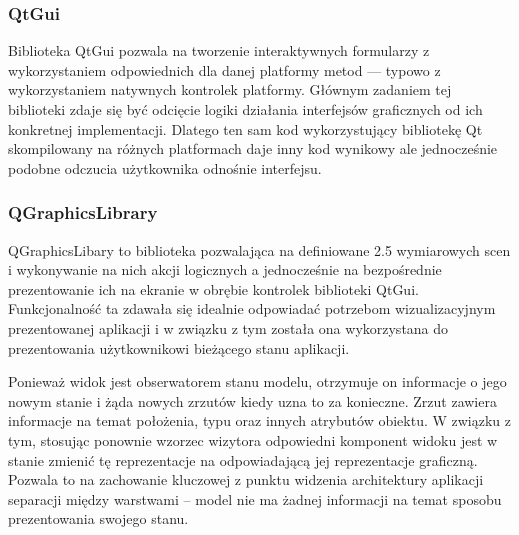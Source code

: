 {{\subsubsection{QtGui}
\par{
Biblioteka QtGui pozwala na tworzenie interaktywnych formularzy z wykorzystaniem odpowiednich dla danej platformy metod --- typowo z wykorzystaniem natywnych kontrolek platformy. Głównym zadaniem tej biblioteki zdaje się być odcięcie logiki działania interfejsów graficznych od ich konkretnej implementacji. Dlatego ten sam kod wykorzystujący bibliotekę Qt skompilowany na różnych platformach daje inny kod wynikowy ale jednocześnie podobne odczucia użytkownika odnośnie interfejsu.
}
\subsubsection{QGraphicsLibrary}
\par{
QGraphicsLibary to biblioteka pozwalająca na definiowane 2.5 wymiarowych scen i wykonywanie na nich akcji logicznych a jednocześnie na bezpośrednie prezentowanie ich na ekranie w obrębie kontrolek biblioteki QtGui. Funkcjonalność ta zdawała się idealnie odpowiadać potrzebom wizualizacyjnym prezentowanej aplikacji i w związku z tym została ona wykorzystana do prezentowania użytkownikowi bieżącego stanu aplikacji.
}
\par{
Ponieważ widok jest obserwatorem stanu modelu, otrzymuje on informacje o jego nowym stanie i żąda nowych zrzutów kiedy uzna to za konieczne. Zrzut zawiera informacje na temat położenia, typu oraz innych atrybutów obiektu. W związku z tym, stosując ponownie wzorzec wizytora odpowiedni komponent widoku jest w stanie zmienić tę reprezentacje na odpowiadającą jej reprezentacje graficzną. Pozwala to na zachowanie kluczowej z punktu widzenia architektury aplikacji separacji między warstwami -- model nie ma żadnej informacji na temat sposobu prezentowania swojego stanu.
}

}}
